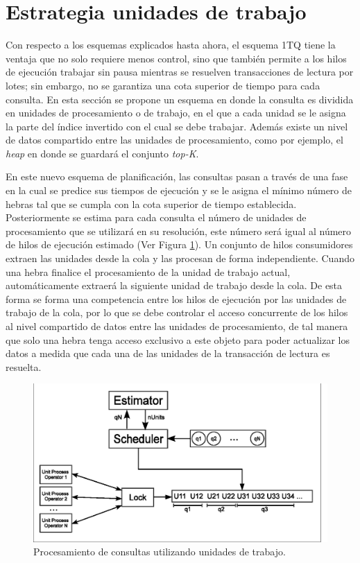 \section{Estrategia unidades de trabajo}
\label{scheduling:unidadestrabajo}
Con respecto a los esquemas explicados hasta ahora, el esquema 1TQ tiene la ventaja que no solo requiere menos control, sino que también permite a los hilos de ejecución trabajar sin pausa mientras se resuelven transacciones de lectura por lotes; sin embargo, no se garantiza una cota superior de tiempo para cada consulta. En esta sección se propone un esquema en donde la consulta es dividida en unidades de procesamiento o de trabajo, en el que a cada unidad se le asigna la parte del índice invertido con el cual se debe trabajar. Además existe un nivel de datos compartido entre las unidades de procesamiento, como por ejemplo, el \textit{heap} en donde se guardará el conjunto \textit{top-K}.

En este nuevo esquema de planificación, las consultas pasan a través de una fase en la cual se predice sus tiempos de ejecución y se le asigna el mínimo número de hebras tal que se cumpla con la cota superior de tiempo establecida. Posteriormente se estima para cada consulta el número de unidades de procesamiento que se utilizará en su resolución, este número será igual al número de hilos de ejecución estimado (Ver Figura \ref{fig:unit_process}). Un conjunto de hilos consumidores extraen las unidades desde la cola y las procesan de forma independiente. Cuando una hebra finalice el procesamiento de la unidad de trabajo actual, automáticamente extraerá la siguiente unidad de trabajo desde la cola. De esta forma se forma una competencia entre los hilos de ejecución por las unidades de trabajo de la cola, por lo que se debe controlar el acceso concurrente de los hilos al nivel compartido de datos entre las unidades de procesamiento, de tal manera que solo una hebra tenga acceso exclusivo a este objeto para poder actualizar los datos a medida que cada una de las unidades de la transacción de lectura es resuelta.


\begin{figure}[!th]
\centering
\includegraphics[scale=.75]{images/unit_process.eps}
\caption{Procesamiento de consultas utilizando unidades de trabajo.}
\label{fig:unit_process}
\end{figure}

